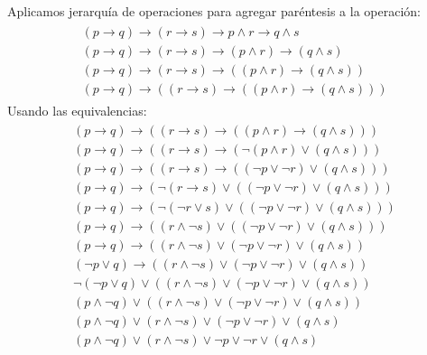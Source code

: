 \documentclass[11pt,letterpaper]{article}
\begin{document}
\begin{enumerate}
    Aplicamos jerarquía de operaciones para agregar paréntesis a la operación:
        \begin{equation}
        \begin{split}
        \begin{aligned}
            (p \to q) \to (r \to s) \to p \land r \to q \land s \\
            (p \to q) \to (r \to s) \to (p \land r) \to (q \land s) \\
            (p \to q) \to (r \to s) \to ((p \land r) \to (q \land s)) \\
            (p \to q) \to ((r \to s) \to ((p \land r) \to (q \land s)))
        \end{aligned}
        \end{split}
        \end{equation}
    Usando las equivalencias:
        \begin{equation}
        \begin{split}
        \begin{aligned}
            (p \to q) \to ((r \to s) \to ((p \land r) \to (q \land s))) \\
            (p \to q) \to ((r \to s) \to (\neg(p \land r) \lor (q \land s))) \\
            (p \to q) \to ((r \to s) \to ((\neg p \lor \neg r) \lor (q \land s))) \\
            (p \to q) \to (\neg (r \to s) \lor ((\neg p \lor \neg r) \lor (q \land s))) \\
            (p \to q) \to (\neg (\neg r \lor s) \lor ((\neg p \lor \neg r) \lor (q \land s))) \\
            (p \to q) \to ((r \land \neg s) \lor ((\neg p \lor \neg r) \lor (q \land s))) \\
            (p \to q) \to ((r \land \neg s) \lor (\neg p \lor \neg r) \lor (q \land s)) \\
            (\neg p \lor q) \to ((r \land \neg s) \lor (\neg p \lor \neg r) \lor (q \land s)) \\
            \neg (\neg p \lor q) \lor ((r \land \neg s) \lor (\neg p \lor \neg r) \lor (q \land s)) \\
            (p \land \neg q) \lor ((r \land \neg s) \lor (\neg p \lor \neg r) \lor (q \land s)) \\
            (p \land \neg q) \lor (r \land \neg s) \lor (\neg p \lor \neg r) \lor (q \land s) \\
            (p \land \neg q) \lor (r \land \neg s) \lor \neg p \lor \neg r \lor (q \land s) \\

\end{aligned}
\end{split}
\end{equation}
\end{enumerate}
\end{document}
